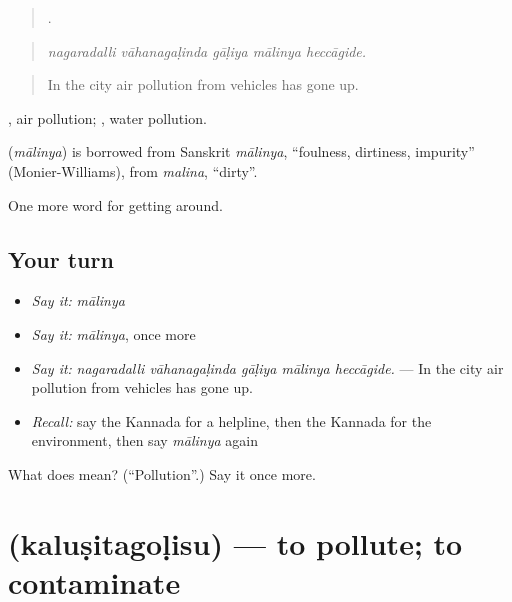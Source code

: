 \begin{quote}
    .
\end{quote}

\begin{quote}
\emph{nagaradalli vāhanagaḷinda gāḷiya mālinya heccāgide.}
\end{quote}

\begin{quote}
In the city air pollution from vehicles has gone up.
\end{quote}

 , air pollution;  , water pollution.

\begin{cousinweb}
\textbf{} (\emph{mālinya}) is borrowed from Sanskrit \emph{mālinya}, \textquotedblleft{}foulness, dirtiness, impurity\textquotedblright{} (Monier-Williams), from \emph{malina}, \textquotedblleft{}dirty\textquotedblright{}.
\end{cousinweb}

\begin{grammarlens}[title={What you've built}]
One more word for getting around.
\end{grammarlens}

\subsection*{Your turn}
\begin{itemize}
\raggedright
  \item \emph{Say it:} \emph{mālinya}
  \item \emph{Say it:} \emph{mālinya}, once more
  \item \emph{Say it:} \emph{nagaradalli vāhanagaḷinda gāḷiya mālinya heccāgide.} — In the city air pollution from vehicles has gone up.
  \item \emph{Recall:} say the Kannada for a helpline, then the Kannada for the environment, then say \emph{mālinya} again
\end{itemize}

\begin{tcolorbox}[breakable,colback=teal!4,colframe=teal!35!black,title={Before you move on}]
What does  mean? (\textquotedblleft{}Pollution\textquotedblright{}.) Say it once more.
\end{tcolorbox}
\section[\texorpdfstring{\kn{ಕಲುಷಿತಗೊಳಿಸು} (kaluṣitagoḷisu)}{ಕಲುಷಿತಗೊಳಿಸು (kaluṣitagoḷisu)}]{ (kaluṣitagoḷisu) — to pollute; to contaminate}

